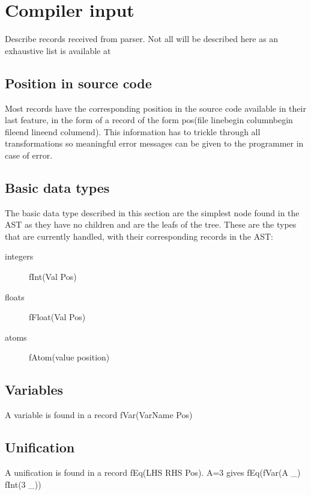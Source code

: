 \documentclass[a4paper]{memoir}
\begin{document}
\section{Compiler input}\label{section:compilerinput}
Describe records received from parser.
Not all will be described here as an exhaustive list is available at %
\subsection{Position in source code}
Most records have the corresponding position in the source code available in their last feature, in the form of a record of the form pos(file linebegin columnbegin fileend lineend columend). This information has to trickle through all transformations so meaningful error messages can be given to the programmer in case of error.
\subsection{Basic data types}
The basic data type described in this section are the simplest node found in the AST as they have no children and are the leafs of the tree.
These are the types that are currently handled, with their corresponding records in the AST:
\begin{description}
  \item[integers] fInt(Val Pos)
  \item[floats] fFloat(Val Pos)
  \item[atoms] fAtom(value position)
\end{description}

\subsection{Variables}
A variable is found in a record fVar(VarName Pos)

\subsection{Unification}
A unification is found in a record fEq(LHS RHS Pos).
A=3 gives fEq(fVar(A \_) fInt(3 \_))
\end{document}
